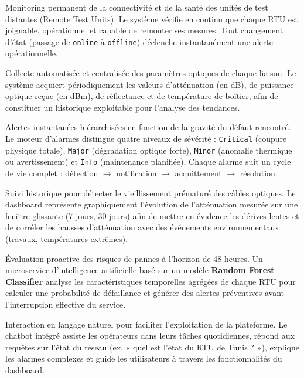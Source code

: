 \documentclass[11pt,a4paper]{article}
\begin{document}
\begin{description}[leftmargin=2cm, style=nextline]
    \item[\textcolor{teal-accent}{\textbf{Supervision des RTU}}]
    Monitoring permanent de la connectivité et de la santé des unités de test distantes (Remote Test Units). Le système vérifie en continu que chaque RTU est joignable, opérationnel et capable de remonter ses mesures. Tout changement d'état (passage de \texttt{online} à \texttt{offline}) déclenche instantanément une alerte opérationnelle.

    \item[\textcolor{teal-accent}{\textbf{Monitoring des fibres}}]
    Collecte automatisée et centralisée des paramètres optiques de chaque liaison. Le système acquiert périodiquement les valeurs d'atténuation (en dB), de puissance optique reçue (en dBm), de réflectance et de température de boîtier, afin de constituer un historique exploitable pour l'analyse des tendances.

    \item[\textcolor{teal-accent}{\textbf{Gestion des alarmes}}]
    Alertes instantanées hiérarchisées en fonction de la gravité du défaut rencontré. Le moteur d'alarmes distingue quatre niveaux de sévérité : \texttt{Critical} (coupure physique totale), \texttt{Major} (dégradation optique forte), \texttt{Minor} (anomalie thermique ou avertissement) et \texttt{Info} (maintenance planifiée). Chaque alarme suit un cycle de vie complet : détection $\rightarrow$ notification $\rightarrow$ acquittement $\rightarrow$ résolution.

    \item[\textcolor{teal-accent}{\textbf{Analyse des tendances d'atténuation}}]
    Suivi historique pour détecter le vieillissement prématuré des câbles optiques. Le dashboard représente graphiquement l'évolution de l'atténuation mesurée sur une fenêtre glissante (7 jours, 30 jours) afin de mettre en évidence les dérives lentes et de corréler les hausses d'atténuation avec des événements environnementaux (travaux, températures extrêmes).

    \item[\textcolor{teal-accent}{\textbf{Prédiction par IA}}]
    Évaluation proactive des risques de pannes à l'horizon de 48 heures. Un microservice d'intelligence artificielle basé sur un modèle \textbf{Random Forest Classifier} analyse les caractéristiques temporelles agrégées de chaque RTU pour calculer une probabilité de défaillance et générer des alertes préventives avant l'interruption effective du service.

    \item[\textcolor{teal-accent}{\textbf{Assistant Intelligent (Chatbot)}}]
    Interaction en langage naturel pour faciliter l'exploitation de la plateforme. Le chatbot intégré assiste les opérateurs dans leurs tâches quotidiennes, répond aux requêtes sur l'état du réseau (ex. « quel est l'état du RTU de Tunis ? »), explique les alarmes complexes et guide les utilisateurs à travers les fonctionnalités du dashboard.
\end{description}
\end{document}
